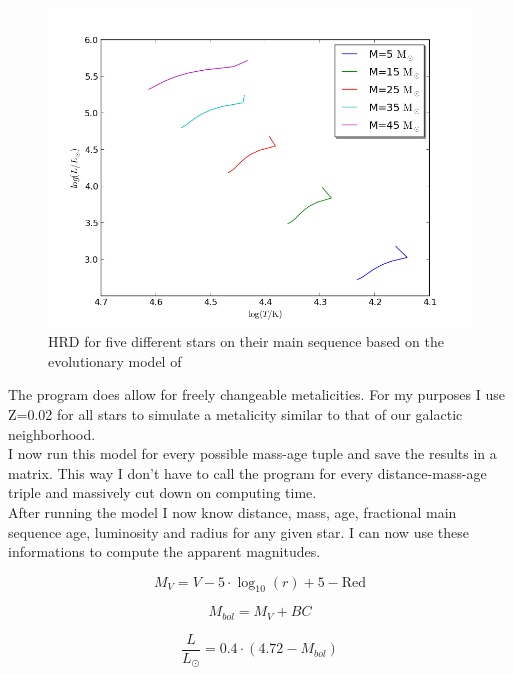 \documentclass[a4paper,10pt]{article}
\begin{document}
 \begin{figure}[h!]
  \includegraphics[width=\textwidth]{lumiradius}
  \caption{HRD for five different stars on their main sequence based on the evolutionary model of \citet{2000MNRAS.315..543H} \label{lumiradius}}
 \end{figure}
 
 The program does allow for freely changeable metalicities. For my purposes I use Z=0.02 for all stars to simulate
 a metalicity similar to that of our galactic neighborhood.\\
 I now run this model for every possible mass-age tuple and save the results in a matrix. This way I don't have to call the program for
 every distance-mass-age triple and massively cut down on computing time.\\
 After running the model I now know distance, mass, age, fractional main sequence age, luminosity and radius for any given star. I can now 
 use these informations to compute the apparent magnitudes.
 
 \begin{equation}
  M_{V}=V-5\cdot\log_{10}(r)+5-\mathrm{Red}
  \label{MV}
 \end{equation}
 
 \begin{equation}
  M_{bol}=M_{V}+BC
  \label{Mbol}
 \end{equation}
 
 \begin{equation}
  \frac{L}{L_\odot}=0.4\cdot(4.72-M_{bol})
  \label{LMbol}
 \end{equation}
 
\end{document}
